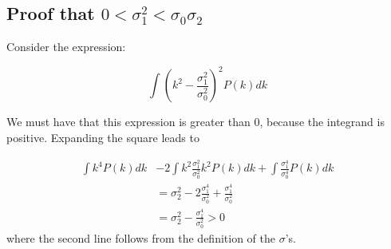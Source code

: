 \documentclass[12pt]{article}
\newcommand{\lfl}[1]{\textcolor{red}{[{\bf LL}: #1]}}
\begin{document}



\subsection{Proof that $0 < \sigma_1^2 < \sigma_0\sigma_2$} \label{Proof}

Consider the expression:

\begin{equation}
\int (k^2 - \frac{\sigma_1^2}{\sigma_0^2})^2 P(k) dk
\end{equation}

\noindent We must have that this expression is greater than 0, because the integrand is positive. Expanding the square leads to

\begin{equation}
\begin{split}
\int k^4 P(k) dk &- 2 \int k^2 \frac{\sigma_1^2}{\sigma_0^2}k^2 P(k) dk + \int \frac{\sigma_1^4}{\sigma_0^4} P(k) dk \\
&= \sigma_2^2 - 2 \frac{\sigma_1^4}{\sigma_0^2} + \frac{\sigma_1^4}{\sigma_0^2} \\
&= \sigma_2^2 - \frac{\sigma_1^4}{\sigma_0^2} > 0
\end{split}
\end{equation}
where the second line follows from the definition of the $\sigma$'s.
\end{document}
